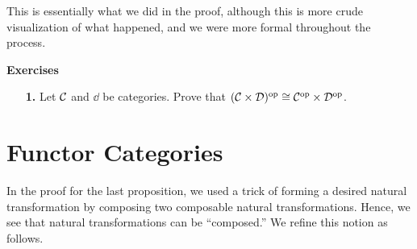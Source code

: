     \begin{minipage}{0.5\textwidth}
        \begin{center}
        \vspace{1cm}

        \end{center}
    \end{minipage}
    \vspace{1cm}

    This is essentially what we did in the proof, although this is more crude
    visualization of what happened, and we were more formal throughout
    the process. 

    {\large \textbf{Exercises}
    \vspace{0.5cm}}
    \begin{itemize}
        \item[\textbf{1.}]
        Let $\mathcal{C}$ and $\dd$ be categories. Prove that 
        $(\mathcal{C} \times \mathcal{D})^{\mathrm{op}} \cong \mathcal{C}^{\mathrm{op}}\times\mathcal{D}^{\mathrm{op}}$. 

    
    \end{itemize}

    

\newpage 
\section{Functor Categories}
    In the proof for the last proposition, we used a trick of forming
    a desired natural transformation by composing two composable
    natural transformations. Hence, we see that natural
    transformations can be ``composed.'' We refine this notion as follows.

